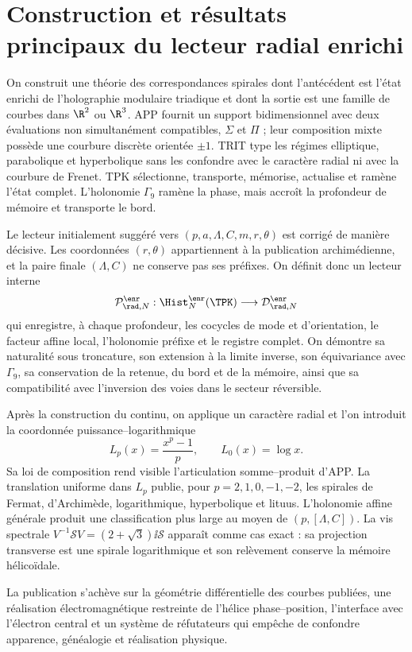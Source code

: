 \part{Construction et résultats principaux du lecteur radial enrichi}
On construit une théorie des correspondances spirales dont l'antécédent est l'état enrichi de l'holographie modulaire triadique et dont la sortie est une famille de courbes dans \(\R^2\) ou \(\R^3\). APP fournit un support bidimensionnel avec deux évaluations non simultanément compatibles, \(\Sigma\) et \(\Pi\) ; leur composition mixte possède une courbure discrète orientée \(\pm1\). TRIT type les régimes elliptique, parabolique et hyperbolique sans les confondre avec le caractère radial ni avec la courbure de Frenet. TPK sélectionne, transporte, mémorise, actualise et ramène l'état complet. L'holonomie \(\Gamma_9\) ramène la phase, mais accroît la profondeur de mémoire et transporte le bord.

Le lecteur initialement suggéré vers \((p,a,\Lambda,C,m,r,\theta)\) est corrigé de manière décisive. Les coordonnées \((r,\theta)\) appartiennent à la publication archimédienne, et la paire finale \((\Lambda,C)\) ne conserve pas ses préfixes. On définit donc un lecteur interne
\[
 \mathcal P^{\enr}_{\rad,N}:\Hist_N^{\enr}(\TPK)
 \longrightarrow \mathcal D^{\enr}_{\rad,N}
\]
qui enregistre, à chaque profondeur, les cocycles de mode et d'orientation, le facteur affine local, l'holonomie préfixe et le registre complet. On démontre sa naturalité sous troncature, son extension à la limite inverse, son équivariance avec \(\Gamma_9\), sa conservation de la retenue, du bord et de la mémoire, ainsi que sa compatibilité avec l'inversion des voies dans le secteur réversible.

Après la construction du continu, on applique un caractère radial et l'on introduit la coordonnée puissance--logarithmique
\[
 L_p(x)=\frac{x^p-1}{p},\qquad L_0(x)=\log x.
\]
Sa loi de composition rend visible l'articulation somme--produit d'APP. La translation uniforme dans \(L_p\) publie, pour \(p=2,1,0,-1,-2\), les spirales de Fermat, d'Archimède, logarithmique, hyperbolique et lituus. L'holonomie affine générale produit une classification plus large au moyen de \((p,[\Lambda,C])\). La vis spectrale \(V^{-1}\mathscr SV=(2+\sqrt3)\ii\mathscr S\) apparaît comme cas exact : sa projection transverse est une spirale logarithmique et son relèvement conserve la mémoire hélicoïdale.

La publication s'achève sur la géométrie différentielle des courbes publiées, une réalisation électromagnétique restreinte de l'hélice phase--position, l'interface avec l'électron central et un système de réfutateurs qui empêche de confondre apparence, généalogie et réalisation physique.

